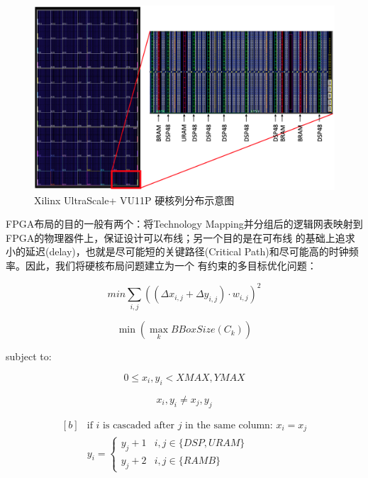 \begin{figure}[h]
	\centering
	\includegraphics[width=\textwidth]{figure/architecture}
	\caption{Xilinx UltraScale+ VU11P 硬核列分布示意图} 
	\label{fig:architecture}
\end{figure}

FPGA布局的目的一般有两个：将Technology Mapping并分组后的逻辑网表映射到FPGA的物理器件上，保证设计可以布线；另一个目的是在可布线
的基础上追求小的延迟(delay)，也就是尽可能短的关键路径(Critical Path)和尽可能高的时钟频率。因此，我们将硬核布局问题建立为一个
有约束的多目标优化问题：


\begin{equation} \label{eq:obj1}
	min \sum_{i,j} ((\Delta{x_{i,j}} + \Delta{y_{i,j}}) \cdot w_{i,j})^2 
\end{equation}

\begin{equation} \label{eq:obj2}
	 \min (\max_{k} BBoxSize(C_k))
\end{equation}

subject to:

\begin{equation} \label{eq:region}
  0 \leq x_i,y_i < XMAX,YMAX
\end{equation}


\begin{equation} \label{eq:overlap}
    {x_i,y_i} \neq {x_j,y_j}
\end{equation}

\begin{equation} \label{eq:cascade}
  \begin{aligned}[b]
	& \textrm{if } i \textrm{ is cascaded after } j \textrm{ in the same column: }
  x_i = x_j \\
	& y_i =
	\begin{cases}
		 y_j + 1  & i, j \in \{  DSP, URAM  \} \\
		 y_j + 2  & i, j \in \{  RAMB \}
	\end{cases}
\end{aligned}
\end{equation}

